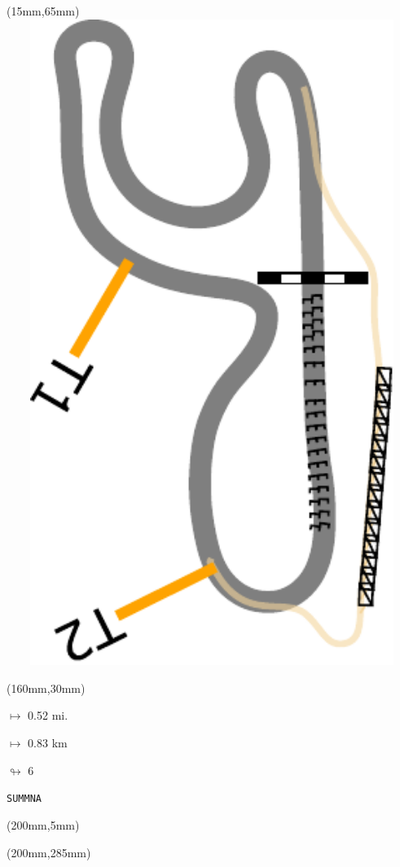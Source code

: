 \begin{textblock*}{185mm}(15mm,65mm)%
\centering
\mbox{\includegraphics[width=185mm,height=210mm,keepaspectratio]{PT/SUMMNA.pdf}}
\end{textblock*}
\begin{textblock*}{40mm}(160mm,30mm)%
\Large
\par$\mapsto$ 0.52 mi.
\par$\mapsto$ 0.83 km
\par$\looparrowright$ 6
\par\hfill\tiny\tt SUMMNA\\
\end{textblock*}
\begin{textblock*}{20mm}(200mm,5mm)%
\fbox{\thepage}
\label{SUMMNA}
\end{textblock*}
\begin{textblock*}{20mm}(200mm,285mm)%
\fbox{\thepage}
\end{textblock*}

